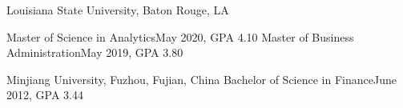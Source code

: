 \documentclass[10pt,a4paper]{article}
\begin{document}

\headedsection
{Louisiana State University, Baton Rouge, LA}
{}
{

  \headedsubsection
  {Master of Science in Analytics}{May 2020, GPA 4.10}{}
  \headedsubsection
  {Master of Business Administration}{May 2019, GPA 3.80}{}
}
\vspace{0.1em}
\headedsection
{Minjiang University, Fuzhou, Fujian, China}{
	\headedsubsection
  {Bachelor of Science in Finance}{June 2012, GPA 3.44}{}
}




\end{document}
